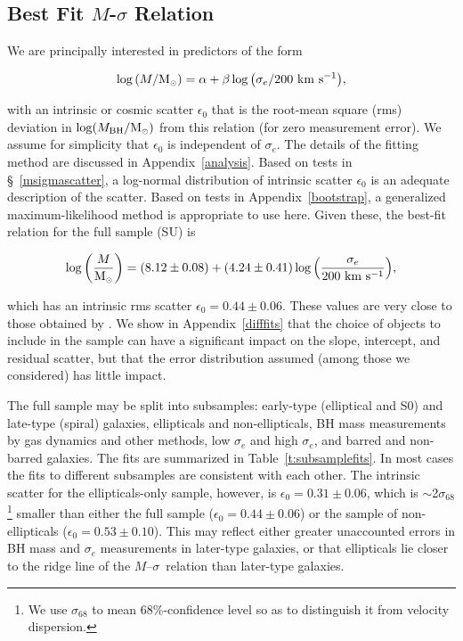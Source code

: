 \documentclass[twosided,letterpaper,numberedappendix]{emulateapj}
\newcommand{\beq}{
\begin{equation}
}
\newcommand{\eeq}{
\end{equation}
}
\newcommand{\msun}     {\ensuremath{{\rm M}_{\scriptscriptstyle \odot}}}
\newcommand{\kms}      {\ensuremath{~\mathrm{km~s^{-1}}}}
\newcommand{\msigma}   {\ensuremath{M}{--}\ensuremath{\sigma}}
\newcommand{\mbh}      {\ensuremath{M_{\mathrm{BH}}}}
\newcommand{\sigmaconf}   {\ensuremath{\sigma_{68}}}
\newcommand{\msinterr} {\ensuremath{8.12 \pm 0.08}}
\newcommand{\msslopeerr} {\ensuremath{4.24 \pm 0.41}}
\newcommand{\msscaterr} {\ensuremath{0.44 \pm 0.06}}
\begin{document}
\label{results}
\subsection{Best Fit \texorpdfstring{$M$-$\sigma$}{M-Sigma} Relation}
\label{msigmaresults}
We are principally interested in predictors of the form
%
\beq
\log{(M/\msun)} = \alpha + \beta \log{\left(\sigma_e/200\kms\right)},
\label{e:msigmaform}
\eeq
%
with an intrinsic or cosmic scatter $\epsilon_0$ that is the root-mean 
square (rms) deviation in $\log(\mbh/\msun)$ from this relation (for 
zero measurement error).  We assume for simplicity that $\epsilon_0$ is
independent of $\sigma_e$.  The details of the fitting method are
discussed in Appendix~\ref{analysis}.  Based on tests
in \S~\ref{msigmascatter}, a log-normal distribution of intrinsic
scatter $\epsilon_0$ is an adequate description of the scatter.  Based
on tests in Appendix~\ref{bootstrap}, a generalized maximum-likelihood
method is appropriate to use here.  Given these, the
best-fit relation for the full sample (SU) is
%
\beq
\log{\left(\frac{M}{\msun}\right)} = (\msinterr) + (\msslopeerr) 
\log{\left(\frac{\sigma_e}{200\kms}\right)},
\label{e:noulmsigmafit}
\eeq
%
which has an intrinsic rms scatter $\epsilon_0
= \msscaterr$.  These values are very close to those obtained by
\citet{tremaineetal02}.  We show in Appendix~\ref{difffits} that the
choice of objects to include in the sample can have a significant
impact on the slope, intercept, and residual scatter, but that the error
distribution assumed (among those we considered) has little impact.

The full sample may be split into subsamples: early-type (elliptical
and S0) and late-type (spiral) galaxies, ellipticals and
non-ellipticals, BH mass measurements by gas dynamics and
other methods, low $\sigma_e$ and high $\sigma_e$, and barred and
non-barred galaxies.  The fits are summarized in
Table~\ref{t:subsamplefits}.  In most cases the fits to different
subsamples are consistent with each other.  The intrinsic scatter for
the ellipticals-only sample, however, is $\epsilon_0 = 0.31 \pm 0.06$,
which is $\sim$2$\sigmaconf$%
\footnote{We use $\sigmaconf$ to mean 68\%-confidence level so as to
distinguish it from velocity dispersion.}
%
 smaller than either the full sample
($\epsilon_0 = \msscaterr$) or the sample of non-ellipticals
($\epsilon_0 = 0.53 \pm 0.10$).  This may reflect either greater
unaccounted errors in BH mass and $\sigma_e$ measurements in
later-type galaxies, or that ellipticals lie closer to the
ridge line of the \msigma\ relation than later-type galaxies.
\end{document}
